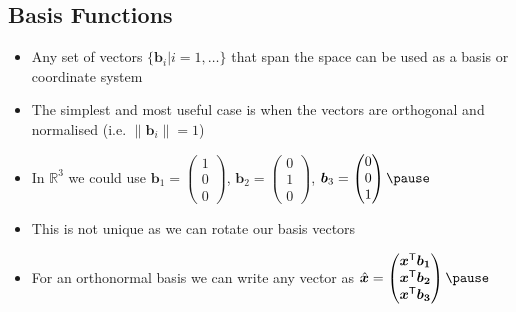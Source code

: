 
\begin{slide}
\section[-2]{Basis Functions}

\begin{PauseHighLight}
  \begin{itemize}
  \item Any set of vectors $\{\bm{b}_i|i=1,\ldots\}$ that span the space
    can be used as a basis or coordinate system\pause
  \item The simplest and most useful case is when the vectors are
    orthogonal and normalised (i.e. $\|\bm{b}_i\|=1$)\pause
  \item In $\mathbb{R}^3$ we could use $\bm{b}_1 =
    \begin{pmatrix}
      1 \\ 0 \\ 0
    \end{pmatrix}$, $\bm{b}_2 =
    \begin{pmatrix}
      0 \\ 1 \\ 0
    \end{pmatrix}$, $\bm{b}_3 =
    \begin{pmatrix}
      0 \\ 0 \\ 1
    \end{pmatrix}\pause$
  \item This is not unique as we can rotate our basis vectors\pause
  \item For an orthonormal basis we can write any vector as $\hat{\bm{x}} =
    \begin{pmatrix}
      \bm{x}^\tr\bm{b_1} \\ \bm{x}^\tr\bm{b_2} \\ \bm{x}^\tr\bm{b_3}
    \end{pmatrix}\pause$
  \end{itemize}
\end{PauseHighLight}

\end{slide}


